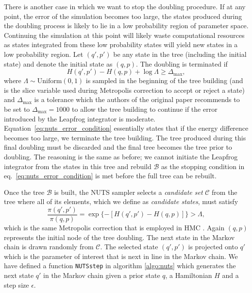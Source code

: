 There is another case in which we want to stop the doubling procedure. If at any point, the error of the simulation becomes too large,
the states produced during the doubling process is likely to lie in a low probability region of parameter space. Continuing the simulation at this point will likely waste computational resources as states integrated from these low probability states will yield new states in a low probability region. Let $(q', p')$ be any state in the tree (including the initial state) and denote the initial state as $(q, p)$. The doubling is terminated if
\begin{equation}\label{eq:nuts_error_condition}
    H(q', p') - H(q, p) + \log \Lambda \geq \Delta_\text{max},
\end{equation}
where $\Lambda \sim \text{Uniform}(0, 1)$ is sampled in the beginning of the tree building (and is the slice variable used during Metropolis correction to accept or reject a state) and $\Delta_\text{max}$ is a tolerance which the authors of the original paper recommends to be set to $\Delta_\text{max} = 1000$ to allow the tree building to continue if the error introduced by the Leapfrog integrator is moderate. Equation~\eqref{eq:nuts_error_condition} essentially states that if the energy difference becomes too large, we terminate the tree building. The tree produced during this final doubling must be discarded and the final tree becomes the tree prior to doubling. The reasoning is the same as before; we cannot initiate the Leapfrog integrator from the states in this tree and rebuild $\mathcal{B}$ as the stopping condition in eq.~\eqref{eq:nuts_error_condition} is met before the full tree can be rebuilt.

Once the tree $\mathcal{B}$ is built, the NUTS sampler selects a \textit{candidate set} $\mathcal{C}$ from the tree where all of its elements, which we define as \textit{candidate states}, must satisfy
\begin{equation}\label{eq:acceptable_states_criterion}
    \frac{\pi(q', p')}{\pi(q, p)} = \exp\{-[H(q', p') - H(q, p) ]\} > \Lambda,
\end{equation}
which is the same Metropolis correction that is employed in HMC \cite{nuts_joonha_park}. Again $(q, p)$ represents the initial node of the tree doubling. The next state in the Markov chain is drawn randomly from $\mathcal{C}$. The selected state $(q', p')$ is projected onto $q'$ which is the parameter of interest that is next in line in the Markov chain. We have defined a function {\tt NUTSstep} in algorithm \ref{algo:nuts} which generates the next state $q'$ in the Markov chain given a prior state $q$, a Hamiltonian $H$ and a step size $\epsilon$.

